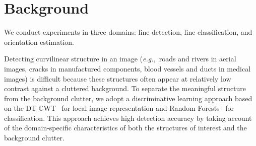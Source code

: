 \documentclass[a4paper]{report}
\def\eg{\emph{e.g.,}}
\def\dtcwt{DT-$\mathbb{C}$WT}
\begin{document}
%


\section{Background}
We conduct experiments in three domains: line detection, line classification, and orientation estimation.

Detecting curvilinear structure in an image (\eg~roads and rivers in aerial images, cracks in manufactured components, blood vessels and ducts in medical images) is difficult because these structures often appear at relatively low contrast against a cluttered background. To separate the meaningful structure from the background clutter, we adopt a discriminative learning approach based on the \dtcwt~\cite{Kingsbury_ACHA01} for local image representation and Random Forests~\cite{Breiman_ML01} for classification. This approach achieves high detection accuracy by taking account of the domain-specific characteristics of both the structures of interest and the background clutter.
\end{document}
